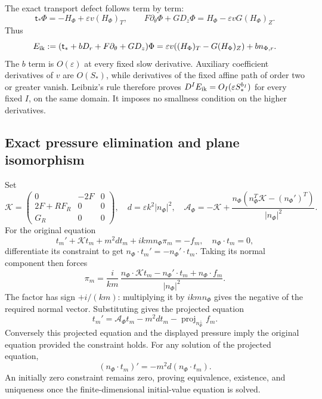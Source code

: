 \documentclass[10pt,a4paper]{article}
\begin{document}
The exact transport defect follows term by term: \[
\mathsf t_*\Phi=-H_\Phi+\varepsilon v(H_\Phi)_T,\qquad
F\partial_\theta\Phi+GD_z\Phi=H_\Phi-\varepsilon vG(H_\Phi)_Z.
\] Thus \[
E_{\rm ik}:=(\mathsf t_*+bD_r+F\partial_\theta+GD_z)\Phi
=\varepsilon v((H_\Phi)_T-G(H_\Phi)_Z)+bn_{\Phi,r}.
\] The \(b\) term is \(O(\varepsilon)\) at every fixed slow derivative. Auxiliary coefficient derivatives of \(v\) are \(O(S_*)\), while derivatives of the fixed affine path of order two or greater vanish. Leibniz's rule therefore proves \(D^IE_{\rm ik}=O_I(\varepsilon S_*^{b_I})\) for every fixed \(I\), on the same domain. It imposes no smallness condition on the higher derivatives.

\subsection{Exact pressure elimination and plane isomorphism}\label{si:exact-pressure-elimination-and-plane-isomorphism}

Set \[
\mathcal K=
\begin{pmatrix}0&-2F&0\\2F+RF_R&0&0\\G_R&0&0\end{pmatrix},
\quad d=\varepsilon k^2|n_\Phi|^2,\quad
\mathcal A_\Phi=-\mathcal K+
\frac{n_\Phi(n_\Phi^T\mathcal K-(n_\Phi')^T)}{|n_\Phi|^2}.
\] For the original equation \[
t_m'+\mathcal Kt_m+m^2dt_m+ikm n_\Phi\pi_m=-f_m,
\quad n_\Phi\cdot t_m=0,
\] differentiate its constraint to get \(n_\Phi\cdot t_m'=-n_\Phi'\cdot t_m\). Taking its normal component then forces \[
\pi_m=\frac{i}{km}\,
\frac{n_\Phi\cdot\mathcal Kt_m-n_\Phi'\cdot t_m+n_\Phi\cdot f_m}{|n_\Phi|^2}.
\] The factor has sign \(+i/(km)\): multiplying it by \(ikm n_\Phi\) gives the negative of the required normal vector. Substituting gives the projected equation \[
t_m'=\mathcal A_\Phi t_m-m^2dt_m-\operatorname{proj}_{n_\Phi^\perp}f_m.
\] Conversely this projected equation and the displayed pressure imply the original equation provided the constraint holds. For any solution of the projected equation, \[
(n_\Phi\cdot t_m)'=-m^2d(n_\Phi\cdot t_m).
\] An initially zero constraint remains zero, proving equivalence, existence, and uniqueness once the finite-dimensional initial-value equation is solved.
\end{document}
